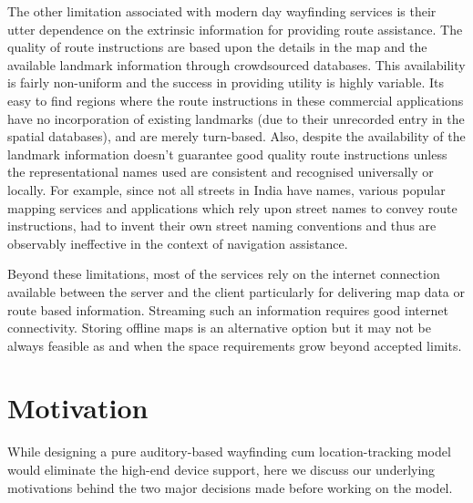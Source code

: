 \documentclass{iitkthesis}
\begin{document}
The other limitation associated with modern day wayfinding services is their utter dependence on the extrinsic information for providing route assistance. The quality of route instructions are based upon the details in the map and the available landmark information through crowdsourced databases. This availability is fairly non-uniform and the success in providing utility is highly variable. Its easy to find regions where the route instructions in these commercial applications have no incorporation of existing landmarks (due to their unrecorded entry in the spatial databases), and are merely turn-based. Also, despite the availability of the landmark information doesn't guarantee good quality route instructions unless the representational names used are consistent and recognised universally or locally. For example, since not all streets in India have names, various popular mapping services and applications which rely upon street names to convey route instructions, had to invent their own street naming conventions and thus are observably ineffective in the context of navigation assistance.

Beyond these limitations, most of the services rely on the internet connection available between the server and the client particularly for delivering map data or route based information. Streaming such an information requires good internet connectivity. Storing offline maps is an alternative option but it may not be always feasible as and when the space requirements grow beyond accepted limits.   


\section{Motivation}
While designing a pure auditory-based wayfinding cum location-tracking model would eliminate the high-end device support, here we discuss our underlying motivations behind the two major decisions made before working on the model.
\end{document}
